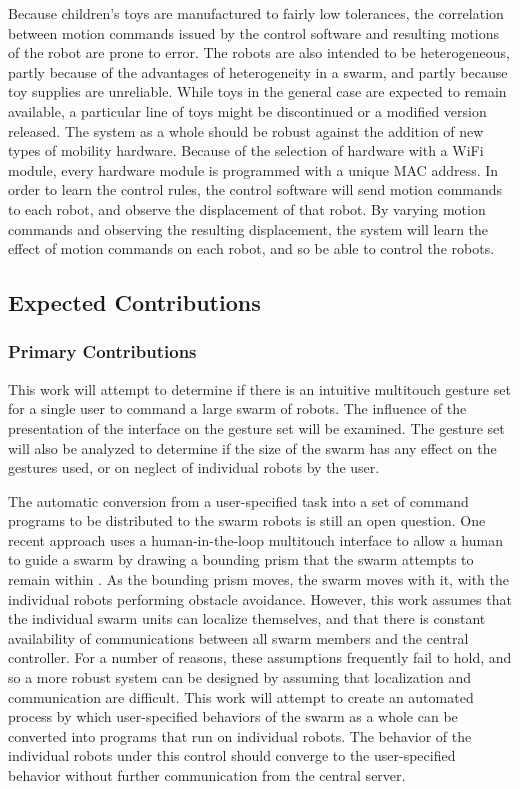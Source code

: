 \documentclass[]{article}
\begin{document}
Because children's toys are manufactured to fairly low tolerances, the correlation between motion commands issued by the control software and resulting motions of the robot are prone to error. 
The robots are also intended to be heterogeneous, partly because of the advantages of heterogeneity in a swarm, and partly because toy supplies are unreliable.
While toys in the general case are expected to remain available, a particular line of toys might be discontinued or a modified version released. 
The system as a whole should be robust against the addition of new types of mobility hardware. 
Because of the selection of hardware with a WiFi module, every hardware module is programmed with a unique MAC address. 
In order to learn the control rules, the control software will send motion commands to each robot, and observe the displacement of that robot. 
By varying motion commands and observing the resulting displacement, the system will learn the effect of motion commands on each robot, and so be able to control the robots. 

\subsection{Expected Contributions}
\subsubsection{Primary Contributions}

This work will attempt to determine if there is an intuitive multitouch gesture set for a single user to command a large swarm of robots.
The influence of the presentation of the interface on the gesture set will be examined. 
The gesture set will also be analyzed to determine if the size of the swarm has any effect on the gestures used, or on neglect of individual robots by the user. 

The automatic conversion from a user-specified task into a set of command programs to be distributed to the swarm robots is still an open question.
One recent approach uses a human-in-the-loop multitouch interface to allow a human to guide a swarm by drawing a bounding prism that the swarm attempts to remain within \cite{ayanian2014controlling}. 
As the bounding prism moves, the swarm moves with it, with the individual robots performing obstacle avoidance. 
However, this work assumes that the individual swarm units can localize themselves, and that there is constant availability of communications between all swarm members and the central controller. 
For a number of reasons, these assumptions frequently fail to hold, and so a more robust system can be designed by assuming that localization and communication are difficult. 
This work will attempt to create an automated process by which user-specified behaviors of the swarm as a whole can be converted into programs that run on individual robots. 
The behavior of the individual robots under this control should converge to the user-specified behavior without further communication from the central server.
\end{document}
